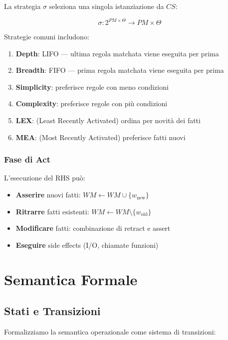 La strategia $\sigma$ seleziona una singola istanziazione da $CS$:

\begin{equation}
\sigma: 2^{PM \times \Theta} \to PM \times \Theta
\end{equation}

Strategie comuni includono:

\begin{enumerate}
\item \textbf{Depth}: LIFO --- ultima regola matchata viene eseguita per prima
\item \textbf{Breadth}: FIFO --- prima regola matchata viene eseguita per prima  
\item \textbf{Simplicity}: preferisce regole con meno condizioni
\item \textbf{Complexity}: preferisce regole con più condizioni
\item \textbf{LEX}: (Least Recently Activated) ordina per novità dei fatti
\item \textbf{MEA}: (Most Recently Activated) preferisce fatti nuovi
\end{enumerate}

\subsubsection{Fase di Act}

L'esecuzione del RHS può:

\begin{itemize}
\item \textbf{Asserire} nuovi fatti: $WM \gets WM \cup \{w_{\text{new}}\}$
\item \textbf{Ritrarre} fatti esistenti: $WM \gets WM \setminus \{w_{\text{old}}\}$
\item \textbf{Modificare} fatti: combinazione di retract e assert
\item \textbf{Eseguire} side effects (I/O, chiamate funzioni)
\end{itemize}

\section{Semantica Formale}

\subsection{Stati e Transizioni}

Formalizziamo la semantica operazionale come sistema di transizioni:

